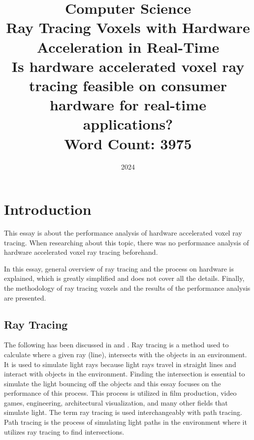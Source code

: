 \documentclass[12pt]{article}
\title{
    Computer Science \\
    \vspace{1cm}
    Ray Tracing Voxels with Hardware Acceleration in Real-Time \\
    \vspace{1cm}
    \large Is hardware accelerated voxel ray tracing feasible on consumer hardware for real-time applications? \\
    \vspace{1cm}
    \large Word Count: 3975
    }
\author{}
\date{2024}
\begin{document}
\maketitle
\clearpage

\tableofcontents
\clearpage


\clearpage

\section{Introduction}

This essay is about the performance analysis of hardware accelerated voxel ray tracing.
When researching about this topic, there was no performance analysis of hardware accelerated voxel ray tracing beforehand.

In this essay, general overview of ray tracing and the process on hardware is explained,
which is greatly simplified and does not cover all the details. Finally, the methodology of
ray tracing voxels and the results of the performance analysis are presented.

\subsection{Ray Tracing}

The following has been discussed in \parencite{NVIDIA:Raytracing} and \parencite{NVIDIA:RTGems2}.
Ray tracing is a method used to calculate where a given ray (line), intersects
with the objects in an environment. It is used to simulate light rays because light rays
travel in straight lines and interact with objects in the environment.
Finding the intersection is essential to simulate the light bouncing off the objects and this essay
focuses on the performance of this process.
This process is utilized in film production, video games, engineering,
architectural visualization, and many other fields that simulate light.
The term ray tracing is used interchangeably with path tracing.
Path tracing is the process of simulating light paths in the environment where it utilizes ray tracing to find intersections.
\end{document}
